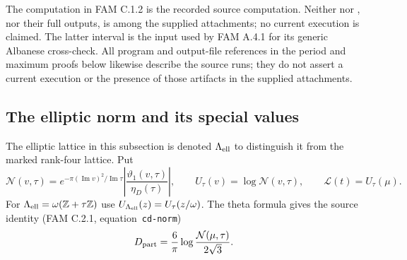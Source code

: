 The computation in FAM C.1.2 is the recorded source computation. Neither  nor , nor their full outputs, is among the supplied attachments; no current execution is claimed. The latter interval is the input used by FAM A.4.1 for its generic Albanese cross-check. All program and output-file references in the period and maximum proofs below likewise describe the source runs; they do not assert a current execution or the presence of those artifacts in the supplied attachments.

\subsection{The elliptic norm and its special values}
The elliptic lattice in this subsection is denoted $\Lambda_{\rm ell}$ to distinguish it from the marked rank-four lattice. Put
\[
\mathcal N(v,\tau)=e^{-\pi(\operatorname{Im}v)^2/\operatorname{Im}\tau}
\left|\frac{\vartheta_1(v,\tau)}{\eta_D(\tau)}\right|,
\qquad U_\tau(v)=\log\mathcal N(v,\tau),
\qquad \mathcal L(t)=U_\tau(\mu).
\]
For $\Lambda_{\rm ell}=\omega(\mathbb Z+\tau\mathbb Z)$ use $U_{\Lambda_{\rm ell}}(z)=U_\tau(z/\omega)$.
The theta formula gives the source identity (FAM C.2.1, equation~\texttt{cd-norm})
\begin{equation}\label{fam:eq:cd-norm}
D_{\rm part}=\frac6\pi\log\frac{\mathcal N(\mu,\tau)}{2\sqrt3}.
\end{equation}

